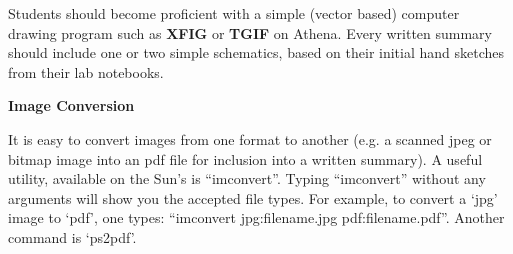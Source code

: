 Students should become proficient with a simple (vector based)
computer drawing program such as {\bf XFIG} or {\bf TGIF} on Athena.
Every written summary should include one or two simple schematics,
based on their initial hand sketches from their lab notebooks.

{\bf Image Conversion}

It is easy to  convert images from one format to another (e.g. a
scanned jpeg or bitmap image into an pdf file for inclusion into a
written summary).  A useful utility, available on the Sun's is
``imconvert''. Typing ``imconvert'' without any arguments will show
you the accepted file types.  For example, to convert a `jpg' image
to `pdf', one types: ``imconvert jpg:filename.jpg
pdf:filename.pdf''.  Another command is `ps2pdf'.  




%




